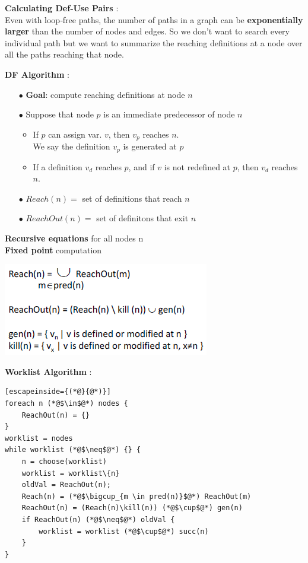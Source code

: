 \documentclass{article}
\begin{document}
\noindent \textbf{Calculating Def‐Use
Pairs} : \\
Even with loop‐free paths, the number of paths in a graph can be \textbf{exponentially larger} than the number of nodes and edges. So we don’t want to search every individual path but we
want to summarize the reaching definitions at a node over all the paths reaching that node.
\begin{multicols}{2}
\noindent \textbf{DF Algorithm} :
\begin{itemize}
    \item [$\bullet$]\textbf{Goal}: compute reaching definitions at node $n$
    \item [$\bullet$]Suppose that node $p$ is an immediate predecessor of node $n$
    \begin{itemize}
        \item If $p$ can assign var. $v$, then $v_p$ reaches $n$.\\We say the definition $v_p$ is generated at $p$
        \item If a definition $v_d$ reaches $p$, and if $v$ is not redefined at $p$, then $v_d$ reaches $n$.
    \end{itemize}
    \item [$\bullet$]$Reach(n) =$ set of definitions that reach $n$
    \item [$\bullet$]$ReachOut(n) =$ set of definitons that exit $n$
\end{itemize}
\columnbreak
\vfill\null
\textbf{Recursive equations} for
all nodes n\\
\textbf{Fixed point} computation
\begin{center}
    \includegraphics[scale = 0.8]{image/12.PNG}
\end{center}
\vfill\null
\end{multicols}

\noindent \textbf{Worklist
Algorithm} :
\begin{lstlisting}[escapeinside={(*@}{@*)}]
foreach n (*@$\in$@*) nodes {
    ReachOut(n) = {}
}
worklist = nodes
while worklist (*@$\neq$@*) {} {
    n = choose(worklist)
    worklist = worklist\{n}
    oldVal = ReachOut(n);
    Reach(n) = (*@$\bigcup_{m \in pred(n)}$@*) ReachOut(m)
    ReachOut(n) = (Reach(n)\kill(n)) (*@$\cup$@*) gen(n)
    if ReachOut(n) (*@$\neq$@*) oldVal {
        worklist = worklist (*@$\cup$@*) succ(n)
    }
}
\end{lstlisting}
\end{document}
